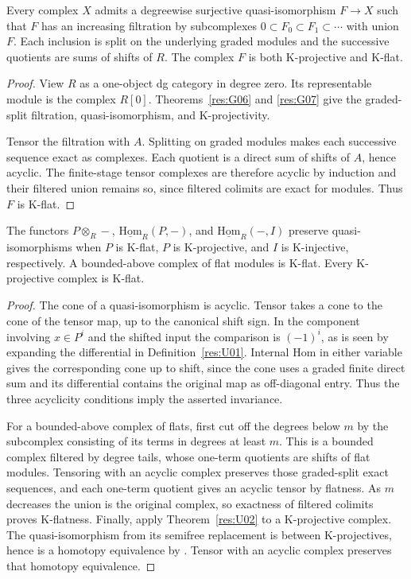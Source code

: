 \begin{theorem}\label{res:U02}
Every complex \(X\) admits a degreewise surjective quasi-isomorphism
\(F\to X\) such that
\(F\) has an increasing filtration by subcomplexes
\(0\subset F_0\subset F_1\subset\cdots\) with union \(F\).
Each inclusion is split on the underlying graded modules and the
successive quotients are sums of shifts of \(R\).
The complex \(F\) is both K-projective and K-flat.
\end{theorem}
\begin{proof}
View \(R\) as a one-object dg category in degree zero.
Its representable module is the complex \(R[0]\).
Theorems~\ref{res:G06} and \ref{res:G07} give the
graded-split filtration, quasi-isomorphism, and K-projectivity.

Tensor the filtration with \(A\). Splitting on graded modules makes
each successive sequence exact as complexes. Each quotient is a
direct sum of shifts of \(A\), hence acyclic. The finite-stage tensor
complexes are therefore acyclic by induction and their filtered
union remains so, since filtered colimits are exact for modules.
Thus \(F\) is K-flat.
\end{proof}

\begin{proposition}\label{res:U03}
The functors \(P\otimes_R-\), \(\underline{\mathrm{Hom}}_R(P,-)\),
and \(\underline{\mathrm{Hom}}_R(-,I)\) preserve quasi-isomorphisms
when \(P\) is K-flat, \(P\) is K-projective, and \(I\) is
K-injective, respectively. A bounded-above complex of flat modules
is K-flat. Every K-projective complex is K-flat.
\end{proposition}
\begin{proof}
The cone of a quasi-isomorphism is acyclic. Tensor takes a cone to
the cone of the tensor map, up to the canonical shift sign.
In the component involving \(x\in P^i\) and the shifted input the
comparison is \((-1)^i\), as is seen by expanding the differential
in Definition~\ref{res:U01}. Internal Hom in either variable
gives the corresponding cone up to shift, since the cone uses
a graded finite direct sum and its differential contains the
original map as off-diagonal entry. Thus the three acyclicity
conditions imply the asserted invariance.

For a bounded-above complex of flats, first cut off the degrees
below \(m\) by the subcomplex consisting of its terms in degrees
at least \(m\). This is a bounded complex filtered by degree tails,
whose one-term quotients are shifts of flat modules. Tensoring with
an acyclic complex preserves those graded-split exact sequences,
and each one-term quotient gives an acyclic tensor by flatness.
As \(m\) decreases the union is the original complex, so exactness
of filtered colimits proves K-flatness. Finally, apply
Theorem~\ref{res:U02} to a K-projective complex. The quasi-isomorphism
from its semifree replacement is between K-projectives, hence is a
homotopy equivalence by \cite[R04]{ha-core}. Tensor with an acyclic
complex preserves that homotopy equivalence. 
\end{proof}

